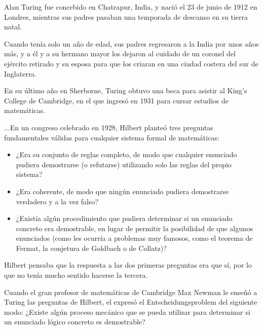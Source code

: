 \documentclass[12pt, fleqn]{report}                             %
\theoremstyle{break}                                            %
\begin{document}
                Alan Turing fue concebido en Chatrapur, India, y nació el 23 de junio de 1912 en Londres,
                mientras sus padres pasaban una temporada de descanso en su tierra natal.

                Cuando tenía solo un año de edad, sus padres regresaron a la India por unos años más,
                y a él y a su hermano mayor los dejaron al cuidado de un coronel del ejército retirado
                y su esposa para que los criaran en una ciudad costera del sur de Inglaterra. 
                
                En su último año en Sherborne, Turing obtuvo una beca para asistir al King’s College de 
                Cambridge, en el que ingresó en 1931 para cursar estudios de matemáticas. 
                
                ...En un congreso celebrado en 1928, Hilbert planteó tres preguntas fundamentales
                válidas para cualquier sistema formal de matemáticas: 

                \begin{itemize}
                    \item 
                        ¿Era su conjunto de reglas completo, de modo que cualquier enunciado pudiera 
                        demostrarse (o refutarse) utilizando solo las reglas del propio sistema?
                    \item 
                        ¿Era coherente, de modo que ningún enunciado pudiera demostrarse verdadero y a la vez falso?
                    \item 
                        ¿Existía algún procedimiento que pudiera determinar si un enunciado concreto 
                        era demostrable, en lugar de permitir la posibilidad de que algunos enunciados 
                        (como les ocurría a problemas muy famosos, como el teorema de Fermat,
                        la conjetura de Goldbach o de Collatz)? 
                \end{itemize}
                
                Hilbert pensaba que la respuesta a las dos primeras preguntas era que sí, 
                por lo que no tenía mucho sentido hacerse la tercera. 

                Cuando el gran profesor de matemáticas de Cambridge Max Newman le
                enseñó a Turing las preguntas de Hilbert, el expresó el Entscheidungsproblem
                del siguiente modo: ¿Existe algún proceso mecánico que se pueda utilizar para determinar
                si un enunciado lógico concreto es demostrable?
\end{document}
